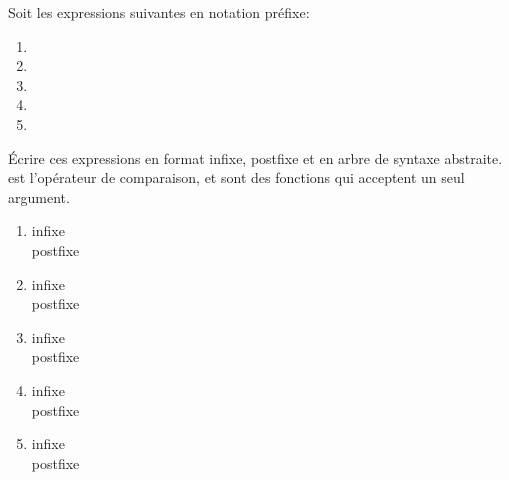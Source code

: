 \begin{Exercise}
\label{ex:grammaire_prefixe}
Soit les expressions suivantes en notation préfixe:
\begin{enumerate}
\item {}
\item {}
\item {}
\item {}
\item {}
\end{enumerate}

Écrire ces expressions en format infixe, postfixe et en arbre de
syntaxe abstraite. \codeinline{==} est l'opérateur de comparaison,
 et  sont des fonctions qui acceptent
un seul argument.
\end{Exercise}

\begin{Answer}[ref={ex:grammaire_prefixe}]

\begin{enumerate}
\item \begin{description}
  \item[infixe] 
  \item[postfixe] 
  \end{description}
\item \begin{description}
  \item[infixe] 
  \item[postfixe] 
  \end{description}
\item \begin{description}
  \item[infixe] 
  \item[postfixe] 
    \end{description}
  \item \begin{description}
    \item[infixe] 
    \item[postfixe] 
    \end{description}
  \item \begin{description}
    \item[infixe] 
    \item[postfixe] 
      \end{description}
\end{enumerate}

\end{Answer}